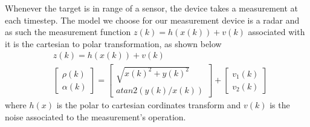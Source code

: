 \documentclass[twocolumn]{article}
\begin{document}
    Whenever the target is in range of a sensor, the device takes a measurement at each timestep.
    The model we choose for our measurement device is a radar and as such the measurement function 
    $z(k)=h(x(k))+v(k)$ associated with it is the cartesian to polar transformation, as shown below
    \begin{align*}
        &z(k)=h(x(k))+v(k)\\
        &\begin{bmatrix}
            \rho(k)\\ \alpha(k)
        \end{bmatrix}=  
        \begin{bmatrix}
            \sqrt{x(k)^2+y(k)^2}\\ atan2(y(k)/x(k))
        \end{bmatrix} +
        \begin{bmatrix}
            v_{1}(k)\\v_{2}(k)
        \end{bmatrix}
    \end{align*}
    where $h(x)$ is the polar to cartesian cordinates transform and $v(k)$ is the noise associated to the measurement's operation.
\end{document}
